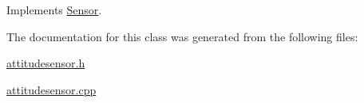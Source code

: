Implements \hyperlink{classSensor_aae4a856357eba6f54139b5add751d230}{Sensor}.



The documentation for this class was generated from the following files\+:\begin{DoxyCompactItemize}
\item 
\hyperlink{attitudesensor_8h}{attitudesensor.\+h}\item 
\hyperlink{attitudesensor_8cpp}{attitudesensor.\+cpp}\end{DoxyCompactItemize}
